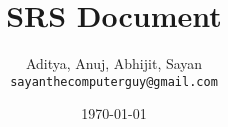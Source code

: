 \documentclass[hidelinks,12pt,a4paper]{report}
\begin{document}
\title{\textbf{SRS Document}}
\author{Aditya, Anuj, Abhijit, Sayan \\ \small \texttt{\color{red}sayanthecomputerguy@gmail.com}}
\date{\today}
\maketitle


\tableofcontents




\appendix
\end{document}
